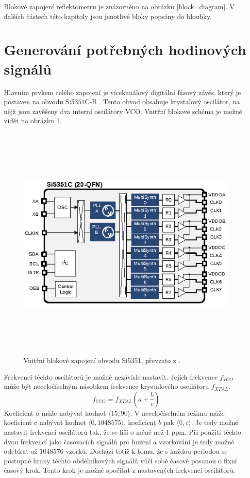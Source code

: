 Blokové zapojení reflektometru je znázorněno na obrázku \ref{block_diagram}. V dalších částech této kapitoly jsou jenotlivé bloky popsány do hloubky.

\section{Generování potřebných hodinových signálů}
Hlavním prvkem celého zapojení je vícekanálový digitální fázový závěs, který je postaven na obvodu Si5351C-B \cite{Si5351datasheet}. Tento obvod obsahuje krystalový oscilátor, na nějž jsou zavěšeny dva interní oscilátory \acrshort{VCO}. Vnitřní blokové schéma je možné vidět na obrázku \ref{si5351_internal_architecture_overview}.

\begin{figure}[htbp]
\includegraphics[width=\textwidth,height=12cm,keepaspectratio]{images/si5351_internal_architecture_overview.eps}\caption{Vnitřní blokové zapojení obvodu Si5351, převzato z \cite{Si5351datasheet}.} \label{si5351_internal_architecture_overview}
\end{figure}

Frekvenci těchto oscilátorů je možné nezávisle nastavit. Jejich frekvence $f_{VCO}$ může být neceločíselným násobkem frekvence krystalového oscilátoru $f_{XTAL}$.
\begin{equation}
f_{VCO}=f_{XTAL} \left(a+\dfrac{b}{c} \right)
\end{equation}
Koeficient $a$ může nabývat hodnot $\langle 15, 90 \rangle$. V neceločíselném režimu může koeficient $c$ nabývat hodnot $\langle 0, 1048575 \rangle$, koeficient $b$ pak $\langle 0, c \rangle$.
Je tedy možné nastavit frekvenci oscilátorů tak, že se liší o méně než 1 ppm. Při použití těchto dvou frekvencí jako časovacích signálů pro buzení a vzorkování je tedy možné odebírat až 1048576 vzorků. Dochází totiž k tomu, že s každou periodou se postupně hrany těchto obdélníkových signálů vůči sobě časově posunou o fixní časový krok. Tento krok je možné spočítat z nastavených frekvencí oscilátorů.


